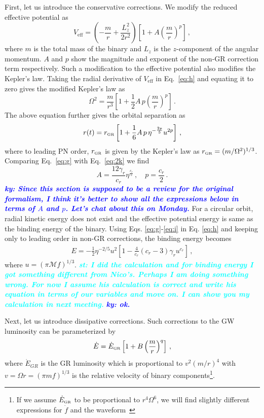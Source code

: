 \documentclass[prd,twocolumn,nofootinbib]{revtex4-1}
\newcommand{\GR}{{\mbox{\tiny GR}}}
\newcommand{\ky}[1]{\textcolor{blue}{\it{\textbf{ky: #1}}} }
\newcommand{\st}[1]{\textcolor{cyan}{\it{\textbf{st: #1}}} }
\begin{document}
First, let us introduce the conservative corrections. We modify the reduced effective potential as
 \begin{equation}\label{eq:h}
 V_{\text{eff}}=\left(-\frac{m}{r}+\frac{{L}^2_{z}}{2r^2}\right)\left[1+A \left(\frac{m}{r}\right)^p\right]\,,
 \end{equation}
where $m$ is the total mass of the binary and $L_{z}$ is the $z$-component of the angular momentum. $A$ and $p$ show the magnitude and exponent of the non-GR correction term respectively. Such a modification to the effective potential also modifies the Kepler's law. Taking the radial derivative of $V_{\text{eff}}$ in Eq.~\eqref{eq:h} and equating it to zero gives the modified Kepler's law as
 \begin{equation}
 \Omega^2=\frac{m}{r^3} \left[1+\frac{1}{2} A \, p\left(\frac{m}{r}\right)^p\right]\,.
 \end{equation}
 The above equation further gives the orbital separation as
 \begin{equation}\label{eq:g}
 r(t)=r_{\GR}\left[1+\frac{1}{6}A\, p\, \eta^{-\frac{2p}{5}}u^{2p}\right]\,,
 \end{equation}
where to leading PN order, $r_{\GR}$ is given by the Kepler's law as $r_{\GR}=(m/\Omega^2)^{1/3}$. Comparing Eq.~\eqref{eq:g} with Eq.~\eqref{eq:2k} we find
\begin{equation}\label{eq:i}
A=\frac{12\gamma_r}{c_r}\eta^{\frac{c_r}{5}}\,, \quad p=\frac{c_r}{2}\,.
\end{equation}
\ky{Since this section is supposed to be a review for the original formalism, I think it's better to show all the expressions below in terms of $A$ and $p$. Let's chat about this on Monday.}
For a circular orbit, radial kinetic energy does not exist and the effective potential energy is same as the binding energy of the binary. Using Eqs. \eqref{eq:g}-\eqref{eq:i} in Eq. \eqref{eq:h} and keeping only to leading order in non-GR corrections, the binding energy becomes
\begin{align}\label{eq:j}
E=-\frac{1}{2}\eta^{-2/5}u^2\left[1-\frac{4}{c_r}(c_r-3)\gamma_ru^{c_r}\right]\,,
\end{align}
where $u=(\pi \mathcal{M} f)^{1/3}$.
\st{I did the calculation and for binding energy I got something different from Nico's. Perhaps I am doing something wrong. For now I assume his calculation is correct and write his equation in terms of our variables and move on. I can show you my calculation in next meeting.} \ky{ok.}

Next, let us introduce dissipative corrections. Such corrections to the GW luminosity can be parameterized by
 \begin{equation}\label{eq:a}
 \dot{E}=\dot{E}_{\GR}\left[1+B\left(\frac{m}{r}\right)^q\right]\,,
 \end{equation}
 where $\dot{E}_{GR}$ is the GR luminosity which is proportional to $v^2(m/r)^4$ with $v=\Omega r = (\pi m f)^{1/3}$ is the relative velocity of binary components\footnote{If we assume $\dot{E}_{\GR}$ to be proportional to $r^4\Omega^6$, we will find slightly different expressions for $\dot{f}$ and the waveform~\cite{Chatziioannou:2012rf}}. 
 
\end{document}
